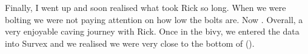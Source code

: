 Finally, I went up and soon realised what took Rick so long. When we were bolting
we were not paying attention on how low the bolts are. Now . Overall, a very
enjoyable caving journey with Rick. Once in the bivy, we entered the
data into Survex and we realised we were very close to the bottom of
 ().




